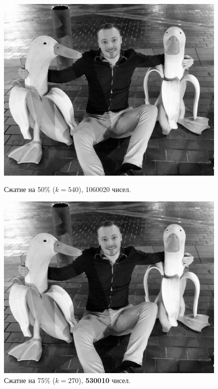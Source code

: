 \documentclass[a3paper,14pt]{extarticle}
\begin{document}
\begin{figure}[H]
\begin{minipage}{0.45\textwidth}
    \end{minipage}\\[1em]
    \begin{minipage}{0.45\textwidth}
        \centering\includegraphics[width=\textwidth]{banana ducks_540.jpg}
        \caption{Сжатие на 50\% ($k=540$), 1060020 чисел.}
    \end{minipage}\hfill
    \begin{minipage}{0.45\textwidth}
        \centering\includegraphics[width=\textwidth]{banana ducks_270.jpg}
        \caption{Сжатие на 75\% ($k=270$), \textbf{530010} чисел.}
    \end{minipage}
\end{figure}
\end{document}
